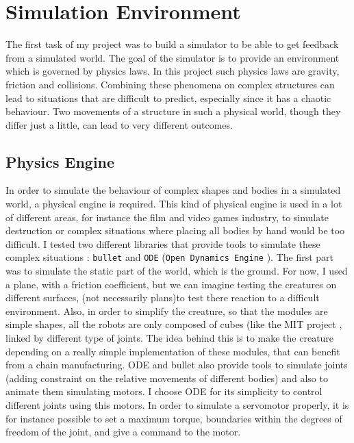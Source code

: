 
\chapter{Simulation Environment} %

\label{Chapter 2} %


The first task of my project was to build a simulator to be able to get feedback from a simulated world. The goal of the simulator is to provide an environment which is governed by physics laws. In this project such physics laws are gravity, friction and collisions. Combining these phenomena on complex structures can lead to situations that are difficult to predict, especially since it has a chaotic behaviour. Two movements of a structure in such a physical world, though they differ just a little, can lead to very different outcomes.  

\section{Physics Engine}

In order to simulate the behaviour of complex shapes and bodies in a simulated world, a physical engine is required. This kind of physical engine is used in a lot of different areas, for instance the film and video games industry, to simulate destruction or complex situations where placing all bodies by hand would be too difficult. I tested two different libraries that provide tools to simulate these complex situations : \verb?bullet? and \verb?ODE? (\verb?Open Dynamics Engine? \cite{ode}). The first part was to simulate the static part of the world, which is the ground. For now, I used a plane, with a friction coefficient, but we can imagine testing the creatures on different surfaces, (not necessarily plans)to test there reaction to a difficult environment. Also, in order to simplify the creature, so that the modules are simple shapes, all the robots are only composed of cubes (like the MIT project \cite{mitcubes}, linked by different type of joints. The idea behind this is to make the creature depending on a really simple implementation of these modules, that can benefit from a chain manufacturing. ODE and bullet also provide tools to simulate joints (adding constraint on the relative movements of different bodies) and also to animate them simulating motors. I choose ODE for its simplicity to control different joints using this motors. In order to simulate a servomotor properly, it is for instance possible to set a maximum torque, boundaries within the degrees of freedom of the joint, and give a command to the motor.
 
